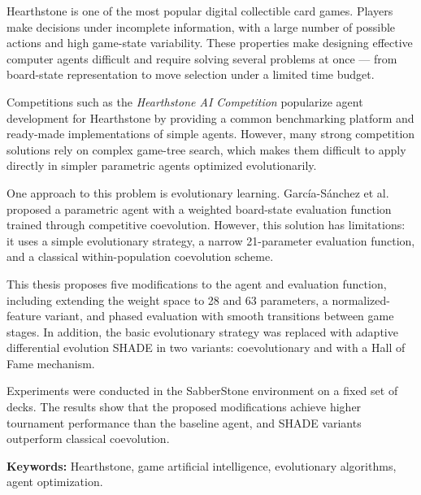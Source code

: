 Hearthstone is one of the most popular digital collectible card games. Players make decisions under incomplete information, with a large number of possible actions and high game-state variability. These properties make designing effective computer agents difficult and require solving several problems at once --- from board-state representation to move selection under a limited time budget.

Competitions such as the \textit{Hearthstone AI Competition} popularize agent development for Hearthstone by providing a common benchmarking platform and ready-made implementations of simple agents. However, many strong competition solutions rely on complex game-tree search, which makes them difficult to apply directly in simpler parametric agents optimized evolutionarily.

One approach to this problem is evolutionary learning. García-Sánchez et al. proposed a parametric agent with a weighted board-state evaluation function trained through competitive coevolution. However, this solution has limitations: it uses a simple evolutionary strategy, a narrow 21-parameter evaluation function, and a classical within-population coevolution scheme.

This thesis proposes five modifications to the agent and evaluation function, including extending the weight space to 28 and 63 parameters, a normalized-feature variant, and phased evaluation with smooth transitions between game stages. In addition, the basic evolutionary strategy was replaced with adaptive differential evolution SHADE in two variants: coevolutionary and with a Hall of Fame mechanism.

Experiments were conducted in the SabberStone environment on a fixed set of decks. The results show that the proposed modifications achieve higher tournament performance than the baseline agent, and SHADE variants outperform classical coevolution.

\textbf{Keywords:} Hearthstone, game artificial intelligence, evolutionary algorithms, agent optimization.

